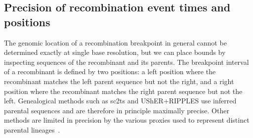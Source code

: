 \documentclass[12pt]{article}
\newcommand{\figref}[1]{Fig.~\ref{#1}}
\begin{document}


\subsection*{Precision of recombination event times and positions}

The genomic location of a recombination breakpoint in general
cannot be determined exactly at single base resolution,
but we can place bounds
by inspecting sequences of the recombinant and its parents.
The breakpoint interval of a recombinant is defined by
two positions: a left position where the recombinant
matches the left parent sequence but not the right, and
a right position where the recombinant matches the right
parent sequence but not the left.
Genealogical methods such as sc2ts and UShER+RIPPLES
use inferred parental sequences and are therefore
in principle maximally precise.
Other methods are limited in precision by the various proxies
used to represent distinct parental lineages~\cite{%
Varabyou2021rapid,Zhou2023virusrecom,Alfonsi2024,Li2024CovRecomb}.
\end{document}
